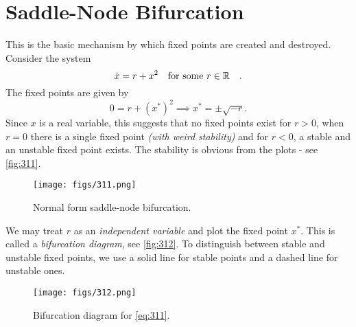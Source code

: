 \documentclass[oneside]{book}
\begin{document}
\section{Saddle-Node Bifurcation}
This is the basic mechanism by which fixed points are created and destroyed. Consider the system
\begin{equation} \label{eq:311}
\dot{x} = r + x^2 \qq{for some $ r \in \R $}.
\end{equation}
The fixed points are given by
\[
0 = r + (x^*) ^ 2 \implies x^* = \pm \sqrt{-r}.
\]
Since $ x $ is a real variable, this suggests that no fixed points exist for $ r > 0 $, when $ r = 0 $ there is a single fixed point \textit{(with weird stability)} and for $ r < 0 $, a stable and an unstable fixed point exists. The stability is obvious from the plots - see \autoref{fig:311}.
\begin{figure}[h]
	\centering
	\texttt{[image: figs/311.png]}
	\caption{Normal form saddle-node bifurcation.}
	\label{fig:311}
\end{figure}
\par
We may treat $ r $ as an \textit{independent variable} and plot the fixed point $ x^* $. This is called a \textit{bifurcation diagram}, see \autoref{fig:312}. To distinguish between stable and unstable fixed points, we use a solid line for stable points and a dashed line for unstable ones.
\begin{figure}[h]
	\centering
	\texttt{[image: figs/312.png]}
	\caption{Bifurcation diagram for \eqref{eq:311}.}
	\label{fig:312}
\end{figure}
\\
\end{document}
